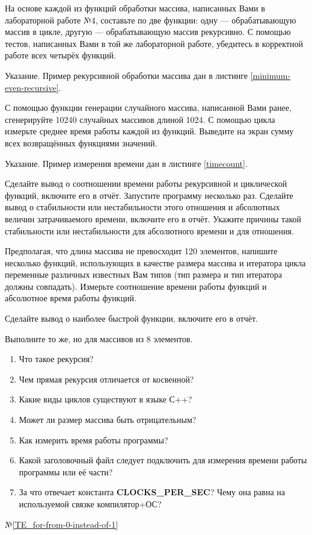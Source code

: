 
\labtask

На основе каждой из функций обработки массива, написанных Вами в лабораторной работе №4, составьте по две функции:
одну --- обрабатывающую массив в цикле, другую --- обрабатывающую массив рекурсивно.
С помощью тестов, написанных Вами в той же лабораторной работе, убедитесь в корректной работе всех четырёх функций.

Указание. Пример рекурсивной обработки массива дан в листинге \ref{minimum-even-recursive}.

\labtask

С помощью функции генерации случайного массива, написанной Вами ранее, сгенерируйте 10240 случайных массивов длиной 1024.
С помощью цикла измерьте среднее время работы каждой из функций.
Выведите на экран сумму всех возвращённых функциями значений.

Указание. Пример измерения времени дан в листинге \ref{timecount}.

Сделайте вывод о соотношении времени работы рекурсивной и циклической функций, включите его в отчёт.
Запустите программу несколько раз.
Сделайте вывод о стабильности или нестабильности этого отношения и абсолютных величин затрачиваемого времени, включите его в отчёт.
Укажите причины такой стабильности или нестабильности для абсолютного времени и для отношения.

\labtask

Предполагая, что длина массива не превосходит 120 элементов, напишите несколько функций, использующих в качестве размера массива и итератора цикла переменные различных известных Вам типов (тип размера и тип итератора должны совпадать).
Измерьте соотношение времени работы функций и абсолютное время работы функций.

Сделайте вывод о наиболее быстрой функции, включите его в отчёт.

\labtask

Выполните то же, но для массивов из 8 элементов.

\labworkquestions
\begin{enumerate}
	\item
		Что такое рекурсия?
	\item
		Чем прямая рекурсия отличается от косвенной?
	\item
		Какие виды циклов существуют в языке С++?
	\item
		Может ли размер массива быть отрицательным?
	\item
		Как измерить время работы программы?
	\item
		Какой заголовочный файл следует подключить для измерения времени работы программы или её части?
	\item
		За что отвечает константа \textbf{CLOCKS\_PER\_SEC}?
		Чему она равна на используемой связке компилятор+ОС?
\end{enumerate}

\typerrors
№\ref{TE_for-from-0-instead-of-1}%
